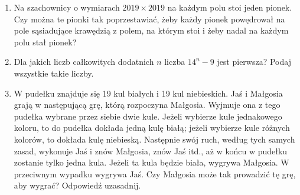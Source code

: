 \documentclass[10pt]{article}
\begin{document}
\begin{enumerate}
  \item Na szachownicy o wymiarach \(2019 \times 2019\) na każdym polu stoi jeden pionek. Czy można te pionki tak poprzestawiać, żeby każdy pionek powędrował na pole sąsiadujące krawędzią z polem, na którym stoi i żeby nadal na każdym polu stał pionek?
  \item Dla jakich liczb całkowitych dodatnich \(n\) liczba \(14^{n}-9\) jest pierwsza? Podaj wszystkie takie liczby.
  \item W pudełku znajduje się 19 kul białych i 19 kul niebieskich. Jaś i Małgosia grają w następującą grę, którą rozpoczyna Małgosia. Wyjmuje ona z tego pudełka wybrane przez siebie dwie kule. Jeżeli wybierze kule jednakowego koloru, to do pudełka dokłada jedną kulę białą; jeżeli wybierze kule różnych kolorów, to dokłada kulę niebieską. Następnie swój ruch, według tych samych zasad, wykonuje Jaś i znów Małgosia, znów Jaś itd., aż w końcu w pudełku zostanie tylko jedna kula. Jeżeli ta kula będzie biała, wygrywa Małgosia. W przeciwnym wypadku wygrywa Jaś. Czy Małgosia może tak prowadzić tę grę, aby wygrać? Odpowiedź uzasadnij.
\end{enumerate}
\end{document}

